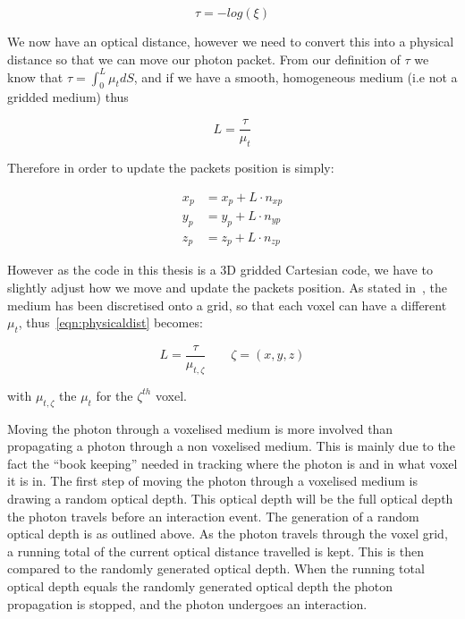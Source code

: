 \begin{equation}
\tau=-log(\xi)\label{eqn:taueqn}
\end{equation} 

We now have an optical distance, however we need to convert this into a physical distance so that we can move our photon packet. From our definition of $\tau$ we know that $\tau=\int_0^L\mu_tdS$, and if we have a smooth, homogeneous medium (i.e not a gridded medium) thus 

\begin{equation}
L=\frac{\tau}{\mu_t}\label{eqn:physicaldist}
\end{equation}

Therefore in order to update the packets position is simply:

\begin{align}
x_p &= x_p+L\cdot n_{xp}\label{eqn:update1}\\
y_p &= y_p+L\cdot n_{yp}\label{eqn:update2}\\
z_p &= z_p+L\cdot n_{zp}\label{eqn:update3}
\end{align}

However as the code in this thesis is a 3D gridded Cartesian code, we have to slightly adjust how we move and update the packets position. As stated in~, the medium has been discretised onto a grid, so that each voxel can have a different $\mu_t$, thus~\cref{eqn:physicaldist} becomes:

\begin{equation}
L=\frac{\tau}{\mu_{t,\zeta}}\quad\quad \zeta=(x,y,z)
\label{eqn:voxeloptdist}
\end{equation}

with $\mu_{t,\zeta}$ the $\mu_t$ for the $\zeta^{th}$ voxel. 

Moving the photon through a voxelised medium is more involved than propagating a photon through a non voxelised medium. 
This is mainly due to the fact the ``book keeping'' needed in tracking where the photon is and in what voxel it is in.
The first step of moving the photon through a voxelised medium is drawing a random optical depth.
This optical depth will be the full optical depth the photon travels before an interaction event.
The generation of a random optical depth is as outlined above.
As the photon travels through the voxel grid, a running total of the current optical distance travelled is kept.
This is then compared to the randomly generated optical depth.
When the running total optical depth equals the randomly generated optical depth the photon propagation is stopped, and the photon undergoes an interaction.

